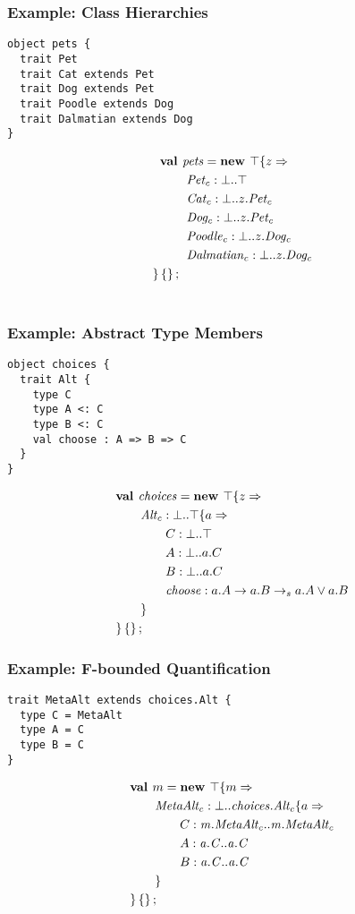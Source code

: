 \documentclass{beamer}
\begin{document}
\begin{frame}[fragile]
\frametitle{Example: Class Hierarchies}
\begin{verbatim}
object pets {
  trait Pet
  trait Cat extends Pet
  trait Dog extends Pet
  trait Poodle extends Dog
  trait Dalmatian extends Dog
}
\end{verbatim}
\begin{align*}
\textbf{val }&\mathit{pets} = \textbf{new }\top \{z \Rightarrow \\
&\ \mathit{Pet_c} : \bot..\top\\
&\ \mathit{Cat_c} : \bot..z.{\mathit{Pet_c}}\\
&\ \mathit{Dog_c} : \bot..z.{\mathit{Pet_c}}\\
&\ \mathit{Poodle_c} : \bot..z.{\mathit{Dog_c}}\\
&\ \mathit{Dalmatian_c} : \bot..z.{\mathit{Dog_c}}\\
 \} \left\{\right\} ;\;\\&
\end{align*}
\end{frame}

\begin{frame}[fragile]
\frametitle{Example: Abstract Type Members}
\begin{verbatim}
object choices {
  trait Alt {
    type C
    type A <: C
    type B <: C
    val choose : A => B => C
  }
}
\end{verbatim}
\begin{align*}
&\textbf{val }\mathit{choices} = \textbf{new }\top \{z \Rightarrow \\
&\quad\quad\mathit{Alt_c} : \bot..\top \{a \Rightarrow \\
&\quad\quad\quad\quad C : \bot..\top\\
&\quad\quad\quad\quad A : \bot..a.C\\
&\quad\quad\quad\quad B : \bot..a.C\\
&\quad\quad\quad\quad\mathit{choose} : a.A \rightarrow a.B\rightarrow_sa.A \vee a.B\\
&\quad\quad \}\\
& \}\left\{\right\} ;\;
\end{align*}
\end{frame}

\begin{frame}[fragile]
\frametitle{Example: F-bounded Quantification}
\begin{verbatim}
trait MetaAlt extends choices.Alt {
  type C = MetaAlt
  type A = C
  type B = C
}
\end{verbatim}
\begin{align*}
&\textbf{val }m = \textbf{new }\top \{m \Rightarrow \\
&\quad\quad\mathit{MetaAlt_c} : \bot..{\mathit{choices.Alt_c}} \{a \Rightarrow \\
&\quad\quad\quad\quad C : \mathit{m.MetaAlt_c}..\mathit{m.MetaAlt_c}\\
&\quad\quad\quad\quad A : \mathit{a.C}..\mathit{a.C}\\
&\quad\quad\quad\quad B : \mathit{a.C}..\mathit{a.C}\\
&\quad\quad \}\\
& \}\left\{\right\} ;\;\\&
\end{align*}
\end{frame}
\end{document}

